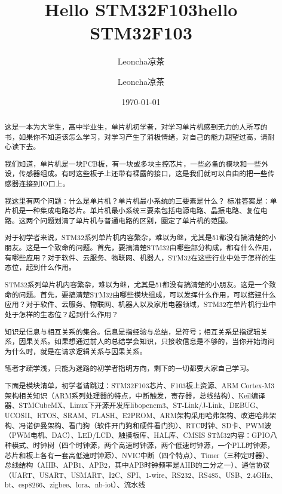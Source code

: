 \documentclass[UTF8]{ctexart}
\title{Hello STM32F103}
\author{Leoncha凉茶}
\title{hello STM32F103}
\author{Leoncha凉茶}
\date{\today}
\begin{document}
\maketitle
{}
\newpage

\begin{abstract}
这是一本为大学生，高中毕业生，单片机初学者，对学习单片机感到无力的人所写的书，如果你不知道该怎么学习，对学习产生了消极情绪，对自己的能力期望过高，请耐心读下去。
  
我们知道，单片机是一块PCB板，有一块或多块主控芯片，一些必备的模块和一些外设，传感器组成。有时这些板子上还带有裸露的接口，这是我们就可以自由的把一些传感器连接到IO口上。

我这里有两个问题：什么是单片机？单片机最小系统的三要素是什么？
标准答案是：单片机是一种集成电路芯片。单片机最小系统三要素包括电源电路、晶振电路、复位电路。这两个问题划清了单片机与普通电路的区别，圈定了单片机的范围。

对于初学者来说，STM32系列单片机内容繁杂，难以为继，尤其是51都没有搞清楚的小朋友。这是一个致命的问题。首先，要搞清楚STM32由哪些部分构成，都有什么作用，有哪些应用？对于软件、云服务、物联网、机器人，STM32在这些行业中处于怎样的生态位，起到什么作用。

STM32系列单片机内容繁杂，难以为继，尤其是51都没有搞清楚的小朋友。这是一个致命的问题。首先，要搞清楚STM32由哪些模块组成，可以发挥什么作用，可以搭建什么应用？对于软件、云服务、物联网、机器人以及家用电器领域，STM32在单片机行业中处于怎样的生态位？起到什么作用？

知识是信息与相互关系的集合。信息是指经验与总结，是符号；相互关系是指逻辑关系，因果关系。如果想通过前人的总结学会知识，只接收信息是不够的，当你开始询问为什么时，就是在请求逻辑关系与因果关系。

笔者才疏学浅，只能为迷路的初学者指明方向，剩下的一切都要大家自己学习。

下面是模块清单，初学者请跳过：STM32F103芯片、F103板上资源、ARM Cortex-M3架构相关知识（ARM系列处理器的特点，中断触发，寄存器，总线结构）、Keil编译器、STMCubeMX、Linux下开源开发库libopencm3、ST-Link/J-Link、DEBUG、UCOSII、RTOS、SRAM、FLASH、E2PROM、ARM架构采用哈弗架构、改进哈弗架构、冯诺伊曼架构、看门狗（软件开门狗和硬件看门狗）、RTC时钟、SD卡、PWM波（PWM电机、DAC）、LED/LCD、触摸板库、HAL库、CMSIS
STM32内容：GPIO八种模式、时钟树（四个时钟源，两个高速时钟源，两个低速时钟源，一个PLL时钟源，芯片和板上各有一套高低速时钟源）、NVIC中断（四个特点）、Timer（三种定时器）、总线结构（AHB、APB1、APB2，其中APB时钟频率是AHB的二分之一）、通信协议（UART、USART、USMART、I2C、SPI、1-wire、RS232、RS485、USB、2.4GHz、bt、esp8266、zigbee、lora、nb-iot）、流水线
\end{abstract}
\end{document}
